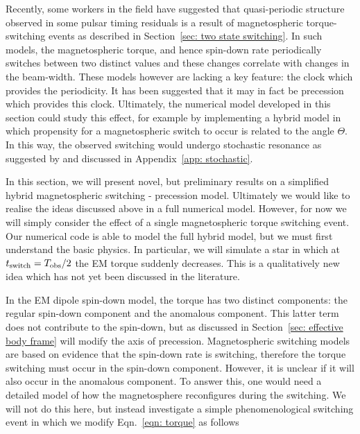 \documentclass[../full_thesis/full_thesis.tex]{subfiles}
\begin{document}
Recently, some workers in the field \citep{Lyne2010, Perera2015} have suggested
that quasi-periodic structure observed in some pulsar timing residuals is a
result of magnetospheric torque-switching events as described in
Section~\ref{sec: two state switching}. In such models, the magnetospheric
torque, and hence spin-down rate periodically switches between two distinct
values and these changes correlate with changes in the beam-width.  These
models however are lacking a key feature: the clock which provides the
periodicity. It has been suggested \citep{Jones2012} that it may in fact be
precession which provides this clock. Ultimately, the numerical model developed
in this section could study this effect, for example by implementing a hybrid
model in which propensity for a magnetospheric switch to occur is related to
the angle $\Theta$. In this way, the observed switching would undergo
stochastic resonance as suggested by \citet{Cordes2013} and discussed in
Appendix~\ref{app: stochastic}.

In this section, we will present novel, but preliminary results on a simplified
hybrid magnetospheric switching - precession model. Ultimately we would like to
realise the ideas discussed above in a full numerical model. However, for now
we will simply consider the effect of a single magnetospheric torque switching
event. Our numerical code is able to model the full hybrid model, but we must
first understand the basic physics. In particular, we will simulate a star in
which at $t_{\mathrm{switch}} = T_{\mathrm{obs}}/2$ the EM torque suddenly decreases. This is
a qualitatively new idea which has not yet been discussed in the literature.

In the EM dipole spin-down model, the torque has two distinct components: the
regular spin-down component and the anomalous component. This latter term does
not contribute to the spin-down, but as discussed in Section~\ref{sec:
effective body frame} will modify the axis of precession. Magnetospheric
switching models are based on evidence that the spin-down rate is switching,
therefore the torque switching must occur in the spin-down component. However,
it is unclear if it will also occur in the anomalous component. To answer this,
one would need a detailed model of how the magnetosphere reconfigures during the
switching. We will not do this here, but instead investigate a simple
phenomenological switching event in which we modify Eqn.~\eqref{eqn: torque} as
follows

\newcommand{\Ss}{S_{\mathrm{S}}}
\newcommand{\Sa}{S_{\mathrm{A}}}
\end{document}
